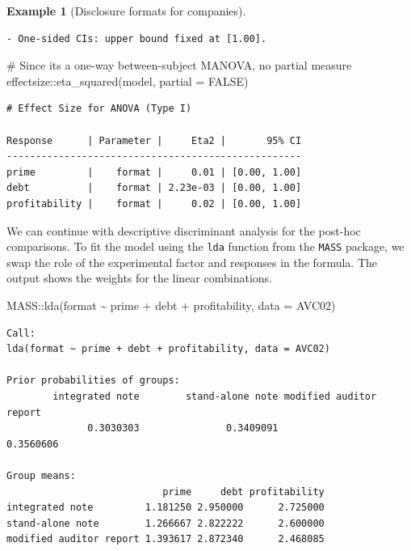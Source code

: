 \documentclass[
  11pt,
  letterpaper,
]{scrbook}
\newenvironment{Shaded}{\begin{snugshade}}{\end{snugshade}}
\newcommand{\AttributeTok}[1]{\textcolor[rgb]{0.40,0.45,0.13}{#1}}
\newcommand{\CommentTok}[1]{\textcolor[rgb]{0.37,0.37,0.37}{#1}}
\newcommand{\ConstantTok}[1]{\textcolor[rgb]{0.56,0.35,0.01}{#1}}
\newcommand{\FunctionTok}[1]{\textcolor[rgb]{0.28,0.35,0.67}{#1}}
\newcommand{\NormalTok}[1]{\textcolor[rgb]{0.00,0.23,0.31}{#1}}
\newcommand{\SpecialCharTok}[1]{\textcolor[rgb]{0.37,0.37,0.37}{#1}}
\theoremstyle{definition}
\theoremstyle{definition}
\newtheorem{example}{Example}[chapter]
\theoremstyle{remark}
\begin{document}
\begin{example}[Disclosure formats for
companies]
\begin{verbatim}
- One-sided CIs: upper bound fixed at [1.00].
\end{verbatim}

\begin{Shaded}
\begin{Highlighting}[]
\CommentTok{\# Since it\textquotesingle{}s a one{-}way between{-}subject MANOVA, no partial measure}
\NormalTok{effectsize}\SpecialCharTok{::}\FunctionTok{eta\_squared}\NormalTok{(model, }\AttributeTok{partial =} \ConstantTok{FALSE}\NormalTok{)}
\end{Highlighting}
\end{Shaded}

\begin{verbatim}
# Effect Size for ANOVA (Type I)

Response      | Parameter |     Eta2 |       95% CI
---------------------------------------------------
prime         |    format |     0.01 | [0.00, 1.00]
debt          |    format | 2.23e-03 | [0.00, 1.00]
profitability |    format |     0.02 | [0.00, 1.00]
\end{verbatim}

We can continue with descriptive discriminant analysis for the post-hoc
comparisons. To fit the model using the \texttt{lda} function from the
\texttt{MASS} package, we swap the role of the experimental factor and
responses in the formula. The output shows the weights for the linear
combinations.

\begin{Shaded}
\begin{Highlighting}[]
\NormalTok{MASS}\SpecialCharTok{::}\FunctionTok{lda}\NormalTok{(format }\SpecialCharTok{\textasciitilde{}}\NormalTok{ prime }\SpecialCharTok{+}\NormalTok{ debt }\SpecialCharTok{+}\NormalTok{ profitability,}
          \AttributeTok{data =}\NormalTok{ AVC02)}
\end{Highlighting}
\end{Shaded}

\begin{verbatim}
Call:
lda(format ~ prime + debt + profitability, data = AVC02)

Prior probabilities of groups:
        integrated note        stand-alone note modified auditor report 
              0.3030303               0.3409091               0.3560606 

Group means:
                           prime     debt profitability
integrated note         1.181250 2.950000      2.725000
stand-alone note        1.266667 2.822222      2.600000
modified auditor report 1.393617 2.872340      2.468085


\end{verbatim}
\end{example}
\end{document}
